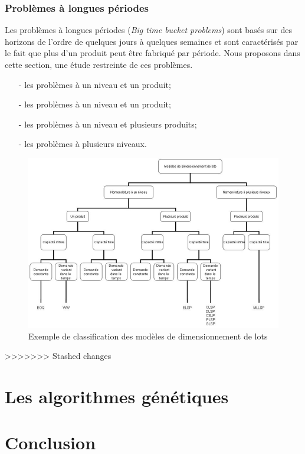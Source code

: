 \documentclass[12pt,a4paper]{article}
\begin{document}
	\subsubsection{Problèmes à longues périodes}
	Les problèmes à longues périodes (\emph{Big time bucket problems}) sont basés sur des
horizons de l'ordre de quelques jours à quelques semaines et sont caractérisés par le fait que plus d'un produit peut être fabriqué par période. Nous proposons dans cette section, une étude restreinte de ces problèmes.
	
	\begin{itemize}
		\item[-] les problèmes à un niveau et un produit;
		\item[-] les problèmes à un niveau et un produit;
		\item[-] les problèmes à un niveau et plusieurs produits;
		\item[-] les problèmes à plusieurs niveaux.
	\end{itemize}
	
	\begin{center}
		\begin{figure}[!h]
			\includegraphics[scale=.5]{img/classification_dimensionnement.png}
			\caption{Exemple de classification des modèles de dimensionnement de lots}
		\end{figure}
	\end{center}
>>>>>>> Stashed changes

\section{Les algorithmes génétiques}
		\section*{Conclusion}
		
\end{document}
